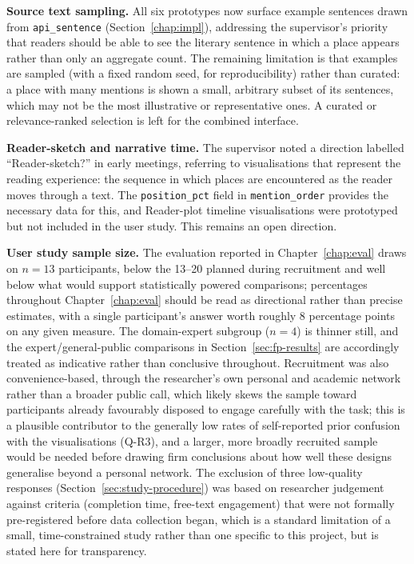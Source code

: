 \documentclass[logo,msc]{infthesis}
\begin{document}
\textbf{Source text sampling.} All six prototypes now surface example sentences drawn from \texttt{api\_sentence} (Section~\ref{chap:impl}), addressing the supervisor's priority that readers should be able to see the literary sentence in which a place appears rather than only an aggregate count. The remaining limitation is that examples are sampled (with a fixed random seed, for reproducibility) rather than curated: a place with many mentions is shown a small, arbitrary subset of its sentences, which may not be the most illustrative or representative ones. A curated or relevance-ranked selection is left for the combined interface.
 
\textbf{Reader-sketch and narrative time.} The supervisor noted a direction labelled ``Reader-sketch?'' in early meetings, referring to visualisations that represent the reading experience: the sequence in which places are encountered as the reader moves through a text. The \texttt{position\_pct} field in \texttt{mention\_order} provides the necessary data for this, and Reader-plot timeline visualisations were prototyped but not included in the user study. This remains an open direction.

\textbf{User study sample size.} The evaluation reported in Chapter~\ref{chap:eval} draws on $n=13$ participants, below the 13--20 planned during recruitment and well below what would support statistically powered comparisons; percentages throughout Chapter~\ref{chap:eval} should be read as directional rather than precise estimates, with a single participant's answer worth roughly 8 percentage points on any given measure. The domain-expert subgroup ($n=4$) is thinner still, and the expert/general-public comparisons in Section~\ref{sec:fp-results} are accordingly treated as indicative rather than conclusive throughout. Recruitment was also convenience-based, through the researcher's own personal and academic network rather than a broader public call, which likely skews the sample toward participants already favourably disposed to engage carefully with the task; this is a plausible contributor to the generally low rates of self-reported prior confusion with the visualisations (Q-R3), and a larger, more broadly recruited sample would be needed before drawing firm conclusions about how well these designs generalise beyond a personal network. The exclusion of three low-quality responses (Section~\ref{sec:study-procedure}) was based on researcher judgement against criteria (completion time, free-text engagement) that were not formally pre-registered before data collection began, which is a standard limitation of a small, time-constrained study rather than one specific to this project, but is stated here for transparency.
 
\end{document}
